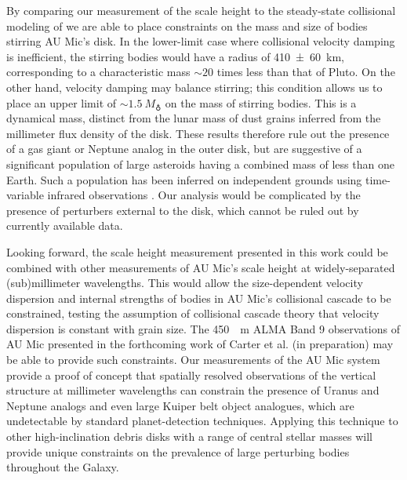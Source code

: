 \documentclass[modern]{aastex62}
\begin{document}
By comparing our measurement of the scale height to the steady-state collisional modeling of \citet{pan&schlichting12} we are able to place constraints on the mass and size of bodies stirring AU Mic's disk.
In the lower-limit case where collisional velocity damping is inefficient, the stirring bodies would have a radius of \SI{410 \pm 60}{km}, corresponding to a characteristic mass $\sim 20$ times less than that of Pluto.
On the other hand, velocity damping may balance stirring; this condition allows us to place an upper limit of $\sim \SI{1.5}{M_\earth}$ on the mass of stirring bodies.
This is a dynamical mass, distinct from the lunar mass of dust grains inferred from the millimeter flux density of the disk.
These results therefore rule out the presence of a gas giant or Neptune analog in the outer disk, but are suggestive of a significant population of large asteroids having a combined mass of less than one Earth. 
Such a population has been inferred on independent grounds using time-variable infrared observations \citep{chiang&fung17}.
Our analysis would be complicated by the presence of perturbers external to the disk, which cannot be ruled out by currently available data.

Looking forward, the scale height measurement presented in this work could be combined with other measurements of AU Mic's scale height at widely-separated (sub)millimeter wavelengths.
This would allow the size-dependent velocity dispersion and internal strengths of bodies in AU Mic's collisional cascade to be constrained, testing the assumption of collisional cascade theory that velocity dispersion is constant with grain size.
The \SI{450}{\mu m} ALMA Band 9 observations of AU Mic presented in the forthcoming work of Carter et al. (in preparation) may be able to provide such constraints.
Our measurements of the AU Mic system provide a proof of concept that spatially resolved observations of the vertical structure at millimeter wavelengths can constrain the presence of Uranus and Neptune analogs and even large Kuiper belt object analogues, which are undetectable by standard planet-detection techniques.  
Applying this technique to other high-inclination debris disks with a range of central stellar masses will provide unique constraints on the prevalence of large perturbing bodies throughout the Galaxy.
\end{document}
